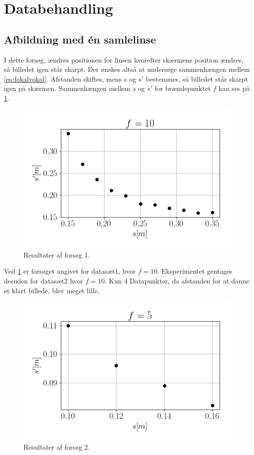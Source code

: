 \section{Databehandling}
\subsection{Afbildning med én samlelinse}
I dette forsøg, ændres positionen for linsen hvorefter skærmens position ændres, så billedet igen står skarpt. Der ønskes altså at undersøge sammenhængen mellem \cref{eq:fokalvokal}. Afstanden skiftes, mens $s$ og $s'$ bestemmes, så billedet står skarpt igen på skærmen.
Sammenhængen mellem $s$ og $s'$ for brændepunktet $f$ kan ses på \cref{fig:res1}.
\begin{figure}[H]
    \includegraphics[width=\linewidth]{res1.png}
    \caption{Resultater af forsøg 1.}
    \label{fig:res1}
\end{figure}
Ved \cref{fig:res1} er forsøget angivet for datasæt1, hvor $f = 10$. Eksperimentet gentages desuden for datasæt2 hvor $f = 10$. Kun 4 Datapunkter, da afstanden for at danne et klart billede, blev meget lille.
\begin{figure}[H]
    \includegraphics[width=\linewidth]{res2.png}
    \caption{Resultater af forsøg 2.}
    \label{fig:res2}
\end{figure}
